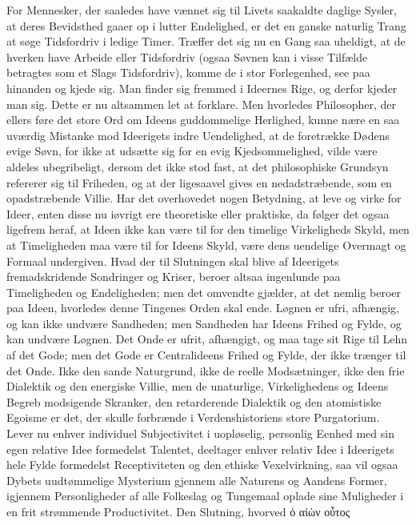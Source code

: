 \documentclass[12pt]{book}
\newcommand{\opage}[1]{\marginnote{\footnotesize\textit{[#1]}}}
\begin{document}
For Mennesker, der saaledes have vænnet sig til Livets saakaldte daglige Sysler, at
deres Bevidsthed gaaer op i lutter Endelighed, er det en ganske naturlig Trang at
søge Tidsfordriv i ledige Timer. Træffer det sig nu en Gang saa uheldigt, at de
hverken have Arbeide eller Tidsfordriv (ogsaa Søvnen kan i visse Tilfælde betragtes
som et Slags Tidsfordriv), komme de i stor Forlegenhed, see paa hinanden og kjede
sig. Man finder sig fremmed i Ideernes Rige, og derfor kjeder man sig. Dette er nu
altsammen let at forklare. Men hvorledes Philosopher, der ellers føre det store Ord
om Ideens guddommelige Herlighed, kunne nære en saa uværdig Mistanke mod Ideerigets
indre Uendelighed, at de foretrække Dødens evige Søvn, for ikke at udsætte sig for en
\opage{276} evig Kjedsommelighed, vilde være aldeles ubegribeligt, dersom det ikke stod fast, at
det philosophiske Grundsyn refererer sig til Friheden, og at der ligesaavel gives en
nedadstræbende, som en opadstræbende Villie. Har det overhovedet nogen Betydning, at
leve og virke for Ideer, enten disse nu iøvrigt ere theoretiske eller praktiske, da
følger det ogsaa ligefrem heraf, at Ideen ikke kan være til for den timelige
Virkeligheds Skyld, men at Timeligheden maa være til for Ideens Skyld, være dens
uendelige Overmagt og Formaal undergiven. Hvad der til Slutningen skal blive af
Ideerigets fremadskridende Sondringer og Kriser, beroer altsaa ingenlunde paa
Timeligheden og Endeligheden; men det omvendte gjælder, at det nemlig beroer paa
Ideen, hvorledes denne Tingenes Orden skal ende. Løgnen er ufri, afhængig, og kan
ikke undvære Sandheden; men Sandheden har Ideens Frihed og Fylde, og kan undvære
Løgnen. Det Onde er ufrit, afhængigt, og maa tage sit Rige til Lehn af det Gode; men
det Gode er Centralideens Frihed og Fylde, der ikke trænger til det Onde. Ikke den
sande Naturgrund, ikke de reelle Modsætninger, ikke den frie Dialektik og den
energiske Villie, men de unaturlige, Virkelighedens og Ideens Begreb modsigende
Skranker, den retarderende Dialektik og den atomistiske Egoisme er det, der skulle
forbrænde i Verdenshistoriens store Purgatorium. Lever nu enhver individuel
Subjectivitet i uopløselig, personlig Eenhed med sin egen relative Idee formedelst
Talentet, deeltager enhver relativ Idee i Ideerigets hele Fylde formedelst
Receptiviteten og den ethiske Vexelvirkning, saa vil ogsaa Dybets uudtømmelige
Mysterium gjennem alle Naturens og Aandens Former, igjennem Personligheder af alle
Folkeslag og Tungemaal oplade sine Muligheder i en frit strømmende Productivitet. Den
Slutning, hvorved ὁ αἰὼν οὗτος
\end{document}

